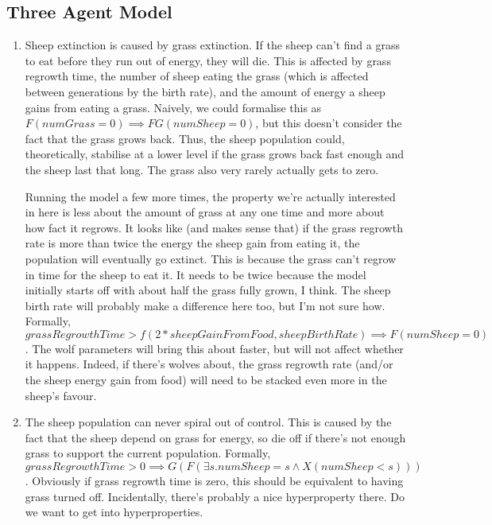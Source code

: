 \documentclass{article}
\begin{document}
\subsection{Three Agent Model}
\begin{enumerate}
  \item Sheep extinction is caused by grass extinction. If the sheep can't find a grass to eat before they run out of energy, they will die. This is affected by grass regrowth time, the number of sheep eating the grass (which is affected between generations by the birth rate), and the amount of energy a sheep gains from eating a grass.
        Naively, we could formalise this as $F(numGrass = 0) \implies FG(numSheep = 0)$, but this doesn't consider the fact that the grass grows back. Thus, the sheep population could, theoretically, stabilise at a lower level if the grass grows back fast enough and the sheep last that long. The grass also very rarely actually gets to zero.

        Running the model a few more times, the property we're actually interested in here is less about the amount of grass at any one time and more about how fact it regrows. It looks like (and makes sense that) if the grass regrowth rate is more than twice the energy the sheep gain from eating it, the population will eventually go extinct. This is because the grass can't regrow in time for the sheep to eat it. It needs to be twice because the model initially starts off with about half the grass fully grown, I think. The sheep birth rate will probably make a difference here too, but I'm not sure how.
        Formally,
        $$grassRegrowthTime > f(2*sheepGainFromFood, sheepBirthRate) \implies F(numSheep = 0)$$.
        The wolf parameters will bring this about faster, but will not affect whether it happens. Indeed, if there's wolves about, the grass regrowth rate (and/or the sheep energy gain from food) will need to be stacked even more in the sheep's favour.
  \item The sheep population can never spiral out of control. This is caused by the fact that the sheep depend on grass for energy, so die off if there's not enough grass to support the current population.
        Formally,
        $$grassRegrowthTime > 0 \implies G(F(\exists s. numSheep = s \land X(numSheep < s)))$$.
        Obviously if grass regrowth time is zero, this should be equivalent to having grass turned off. Incidentally, there's probably a nice hyperproperty there. Do we want to get into hyperproperties.
\end{enumerate}
\end{document}
